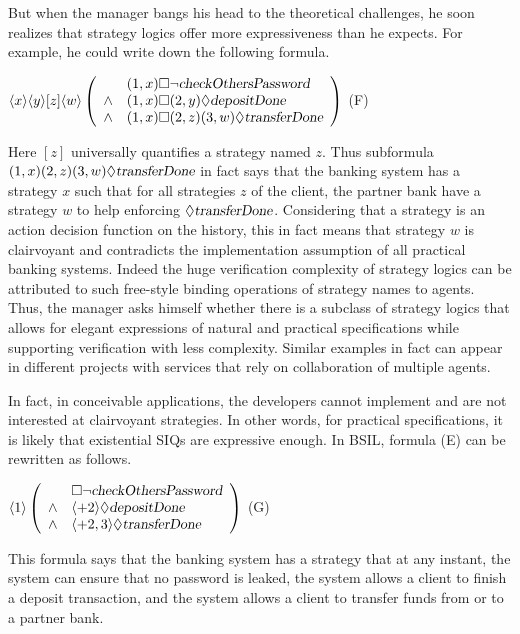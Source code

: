 \documentclass[11pt]{article}
\newcommand{\pfrr}{\Box}
\newcommand{\pevt}{\Diamond}
\begin{document}
But when the manager bangs his head to the theoretical challenges, 
he soon realizes that strategy logics offer more expressiveness than he expects.  
For example, he could write down the following formula. 
\begin{center} 
\hfill 
$\langle x\rangle \langle y\rangle[ z] \langle w\rangle \left(\begin{array}{cl}
		& (1,x)\pfrr\neg \mbox{\sl checkOthersPassword}\\
\wedge 	& (1,x)\pfrr (2,y)\pevt \mbox{\sl depositDone} \\
\wedge  & (1,x)\pfrr (2,z)(3,w)\pevt\mbox{\sl transferDone} 
\end{array}\right)$
\hfill (F) 
\end{center}  
Here $[z]$ universally quantifies a strategy named $z$.  
Thus subformula $(1,x)(2,z)(3,w)\pevt\mbox{\sl transferDone}$ in fact says that 
the banking system has a strategy $x$ such that for all strategies $z$ of the client, 
the partner bank have a strategy $w$ to help enforcing 
$\pevt\mbox{\sl transferDone}$.  
Considering that a strategy is an action decision function on the history, 
this in fact means that strategy $w$ is clairvoyant and contradicts the implementation assumption 
of all practical banking systems.  
Indeed the huge verification complexity of strategy logics 
can be attributed to such free-style binding operations of strategy names to agents.   
Thus, the manager asks himself whether there is a subclass of strategy logics that 
allows for elegant expressions of natural and practical specifications while supporting 
verification with less complexity.  
Similar examples in fact can appear in different projects with services that rely on collaboration of 
multiple agents.  

In fact, in conceivable applications, the developers cannot implement and are not interested at 
clairvoyant strategies.  
In other words, for practical specifications, it is likely that 
existential SIQs are expressive enough.  
In BSIL, formula (E) can be rewritten as follows.  
\begin{center} \hfill 
$\langle 1\rangle \left(\begin{array}{cl}
		& \pfrr \neg \mbox{\sl checkOthersPassword}\\
\wedge 	& \langle +2\rangle\pevt \mbox{\sl depositDone} \\
\wedge  & \langle+2,3\rangle\pevt\mbox{\sl transferDone} 
\end{array}\right)$
\hfill (G) 
\end{center}   
This formula says that the banking system has a strategy that 
at any instant, the system can ensure that no password is leaked, 
the system allows a client to finish a deposit transaction, and 
the system allows a client to transfer funds from or to a partner bank. 
\end{document}

